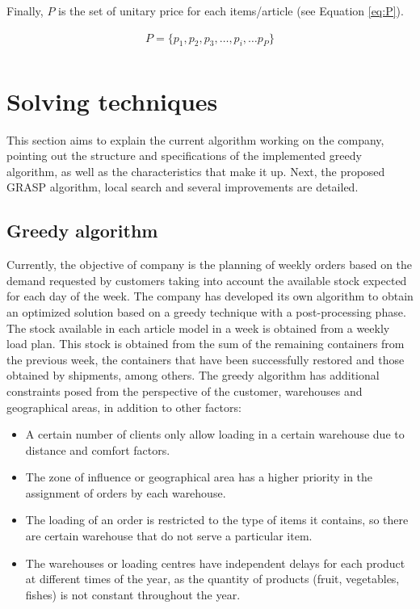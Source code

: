 \documentclass[letterpaper]{article} %
\begin{document}
Finally, $P$ is the set of unitary price for each items/article (see Equation \ref{eq:P}).

\begin{equation}
    \begin{aligned}\label{eq:P}
        P = \{p_1, p_2, p_3, \dots, p_i, \dots p_P \}\\
    \end{aligned}
\end{equation}


\section*{Solving techniques}

This section aims to explain the current algorithm working on the company, pointing out the structure and specifications of the implemented greedy algorithm, as well as the characteristics that make it up. Next, the proposed GRASP algorithm, local search and several improvements are detailed.

\subsection*{Greedy algorithm }
Currently, the objective of company is the planning of weekly orders based on the demand requested by customers taking into account the available stock expected for each day of the week. The company has developed its own algorithm to obtain an optimized solution based on a greedy technique with a post-processing phase.
The stock available in each article model in a week is obtained from a weekly load plan. This stock is obtained from the sum of the remaining containers from the previous week, the containers that have been successfully restored and those obtained by shipments, among others. The greedy algorithm has additional constraints posed from the perspective of the customer, warehouses and geographical areas, in addition to other factors:

\begin{itemize}
    \item A certain number of clients only allow loading in a certain warehouse due to distance and comfort factors.
    \item The zone of influence or geographical area has a higher priority in the assignment of orders by each warehouse.
    \item The loading of an order is restricted to the type of items it contains, so there are certain warehouse that do not serve a particular item.
    \item The warehouses or loading centres have independent delays for each product at different times of the year, as the quantity of products (fruit, vegetables, fishes) is not constant throughout the year.
\end{itemize}
\end{document}

